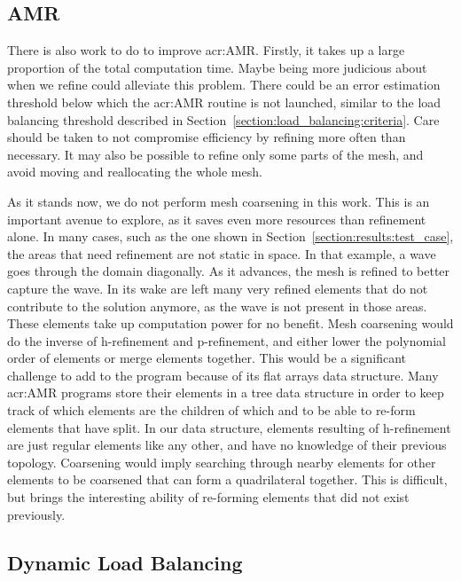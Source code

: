 \subsection{AMR}\label{subsection:conclusion:future_work:amr}

There is also work to do to improve \acrlong{acr:AMR}. Firstly, it takes up a large proportion of
the total computation time. Maybe being more judicious about when we refine could alleviate this
problem. There could be an error estimation threshold below which the \acrshort{acr:AMR} routine is
not launched, similar to the load balancing threshold described in
Section~\ref{section:load_balancing:criteria}. Care should be taken to not compromise efficiency by
refining more often than necessary. It may also be possible to refine only some parts of the mesh,
and avoid moving and reallocating the whole mesh.

As it stands now, we do not perform mesh coarsening in this work. This is an important avenue to
explore, as it saves even more resources than refinement alone. In many cases, such as the one shown
in Section~\ref{section:results:test_case}, the areas that need refinement are not static in space.
In that example, a wave goes through the domain diagonally. As it advances, the mesh is refined to
better capture the wave. In its wake are left many very refined elements that do not contribute to
the solution anymore, as the wave is not present in those areas. These elements take up computation
power for no benefit. Mesh coarsening would do the inverse of h-refinement and p-refinement, and
either lower the polynomial order of elements or merge elements together. This would be a
significant challenge to add to the program because of its flat arrays data structure. Many
\acrshort{acr:AMR} programs store their elements in a tree data structure in order to keep track of
which elements are the children of which and to be able to re-form elements that have split. In our
data structure, elements resulting of h-refinement are just regular elements like any other, and
have no knowledge of their previous topology. Coarsening would imply searching through nearby
elements for other elements to be coarsened that can form a quadrilateral together. This is
difficult, but brings the interesting ability of re-forming elements that did not exist previously.

\subsection{Dynamic Load Balancing}\label{subsection:conclusion:future_work:load_balancing}

